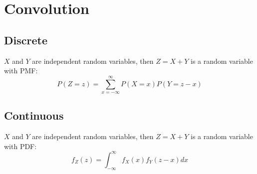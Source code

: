 \section{Convolution}
    \subsection*{Discrete}
        $X$ and $Y$ are independent random variables, then $Z=X+Y$ is a random variable with PMF:
        \begin{equation*}
            P(Z=z) = \sum_{x=-\infty}^{\infty} P(X=x)P(Y=z-x)
        \end{equation*}
    \subsection*{Continuous}
        $X$ and $Y$ are independent random variables, then $Z=X+Y$ is a random variable with PDF:
        \begin{equation*}
            f_Z(z) = \int_{-\infty}^{\infty} f_X(x)f_Y(z-x) dx
        \end{equation*}

    
    
   
    
    
